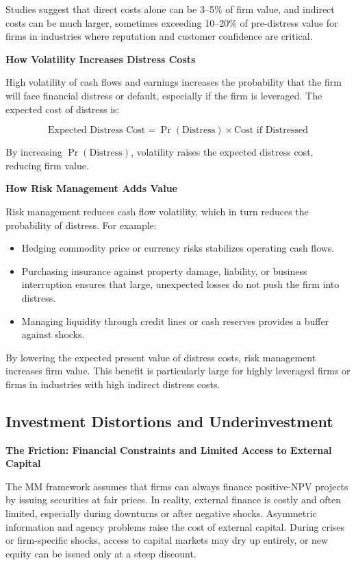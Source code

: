\documentclass[11pt,openany]{book}
\providecommand{\tightlist}{\setlength{\itemsep}{0pt}\setlength{\parskip}{0pt}}
\begin{document}
Studies suggest that direct costs alone can be 3--5\% of firm value, and indirect costs can be much larger, sometimes exceeding 10--20\% of pre-distress value for firms in industries where reputation and customer confidence are critical.

\textbf{How Volatility Increases Distress Costs}

High volatility of cash flows and earnings increases the probability that the firm will face financial distress or default, especially if the firm is leveraged. The expected cost of distress is:

\[
\text{Expected Distress Cost} = \Pr(\text{Distress}) \times \text{Cost if Distressed}
\]

By increasing \(\Pr(\text{Distress})\), volatility raises the expected distress cost, reducing firm value.

\textbf{How Risk Management Adds Value}

Risk management reduces cash flow volatility, which in turn reduces the probability of distress. For example:

\begin{itemize}
\tightlist
\item
  Hedging commodity price or currency risks stabilizes operating cash flows.
\item
  Purchasing insurance against property damage, liability, or business interruption ensures that large, unexpected losses do not push the firm into distress.
\item
  Managing liquidity through credit lines or cash reserves provides a buffer against shocks.
\end{itemize}

By lowering the expected present value of distress costs, risk management increases firm value. This benefit is particularly large for highly leveraged firms or firms in industries with high indirect distress costs.

\subsection{Investment Distortions and Underinvestment}\label{investment-distortions-and-underinvestment}

\textbf{The Friction: Financial Constraints and Limited Access to External Capital}

The MM framework assumes that firms can always finance positive-NPV projects by issuing securities at fair prices. In reality, external finance is costly and often limited, especially during downturns or after negative shocks. Asymmetric information and agency problems raise the cost of external capital. During crises or firm-specific shocks, access to capital markets may dry up entirely, or new equity can be issued only at a steep discount.
\end{document}
